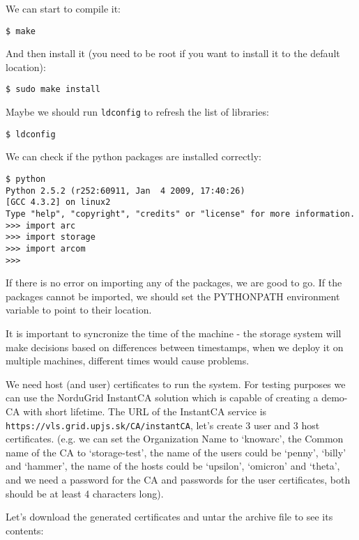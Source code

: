 \documentclass{book}
\begin{document}
We can start to compile it:

\begin{verbatim}
$ make
\end{verbatim}

And then install it (you need to be root if you want to install it to the default location):

\begin{verbatim}
$ sudo make install
\end{verbatim}

Maybe we should run \verb!ldconfig! to refresh the list of libraries:

\begin{verbatim}
$ ldconfig
\end{verbatim}

We can check if the python packages are installed correctly:

\begin{verbatim}
$ python
Python 2.5.2 (r252:60911, Jan  4 2009, 17:40:26) 
[GCC 4.3.2] on linux2
Type "help", "copyright", "credits" or "license" for more information.
>>> import arc
>>> import storage
>>> import arcom
>>> 
\end{verbatim}

If there is no error on importing any of the packages, we are good to go. If the packages cannot be imported, we should set the PYTHONPATH environment variable to point to their location.

It is important to syncronize the time of the machine - the storage system will make decisions based on differences between timestamps, when we deploy it on multiple machines, different times would cause problems.

We need host (and user) certificates to run the system. For testing purposes we can use the NorduGrid InstantCA solution which is capable of creating a demo-CA with short lifetime. The URL of the InstantCA service is \verb!https://vls.grid.upjs.sk/CA/instantCA!, let's create 3 user and 3 host certificates. (e.g. we can set the Organization Name to `knowarc', the Common name of the CA to `storage-test', the name of the users could be `penny', `billy' and `hammer', the name of the hosts could be `upsilon', `omicron' and `theta', and we need a password for the CA and passwords for the user certificates, both should be at least 4 characters long).

Let's download the generated certificates and untar the archive file to see its contents:
\end{document}
